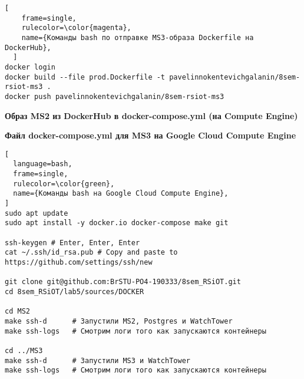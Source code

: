 \documentclass[12pt, a4paper, simple]{eskdtext}
\begin{document}
  \begin{lstlisting}[
    frame=single,
    rulecolor=\color{magenta},
    name={Команды bash по отправке MS3-образа Dockerfile на DockerHub},
  ]
docker login
docker build --file prod.Dockerfile -t pavelinnokentevichgalanin/8sem-rsiot-ms3 .
docker push pavelinnokentevichgalanin/8sem-rsiot-ms3
\end{lstlisting}

  \newpage
  \begin{center}
    \textbf{Образ MS2 из DockerHub в docker-compose.yml (на Compute Engine)}
  \end{center}

  
  
  
  
  


  \newpage
  \begin{center}
    \textbf{Файл docker-compose.yml для MS3 на Google Cloud Compute Engine}
  \end{center}

  
  
  
  
  \newpage

  

\begin{lstlisting}[
  language=bash,
  frame=single,
  rulecolor=\color{green},
  name={Команды bash на Google Cloud Compute Engine},
]
sudo apt update
sudo apt install -y docker.io docker-compose make git

ssh-keygen # Enter, Enter, Enter
cat ~/.ssh/id_rsa.pub # Copy and paste to https://github.com/settings/ssh/new

git clone git@github.com:BrSTU-PO4-190333/8sem_RSiOT.git
cd 8sem_RSiOT/lab5/sources/DOCKER

cd MS2
make ssh-d      # Запустили MS2, Postgres и WatchTower
make ssh-logs   # Смотрим логи того как запускаются контейнеры

cd ../MS3
make ssh-d      # Запустили MS3 и WatchTower
make ssh-logs   # Смотрим логи того как запускаются контейнеры
\end{lstlisting}
\end{document}

